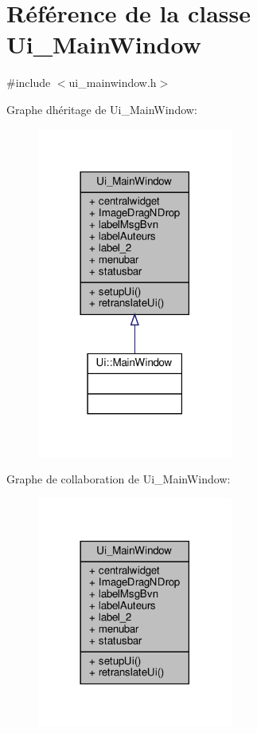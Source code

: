 \hypertarget{class_ui___main_window}{}\section{Référence de la classe Ui\+\_\+\+Main\+Window}
\label{class_ui___main_window}


{\ttfamily \#include $<$ui\+\_\+mainwindow.\+h$>$}



Graphe d\textquotesingle{}héritage de Ui\+\_\+\+Main\+Window\+:
\nopagebreak
\begin{figure}[H]
\begin{center}
\leavevmode
\includegraphics[width=182pt]{class_ui___main_window__inherit__graph}
\end{center}
\end{figure}


Graphe de collaboration de Ui\+\_\+\+Main\+Window\+:
\nopagebreak
\begin{figure}[H]
\begin{center}
\leavevmode
\includegraphics[width=182pt]{class_ui___main_window__coll__graph}
\end{center}
\end{figure}

